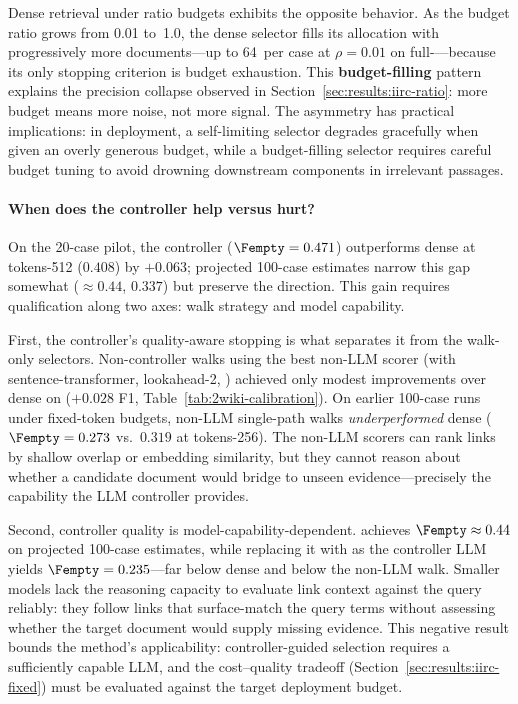 Dense retrieval under ratio budgets exhibits the opposite behavior.
As the budget ratio grows from 0.01 to~1.0, the dense selector fills its
allocation with progressively more documents---up to 64~per case at
$\rho = 0.01$ on full-\IIRC---because its only stopping criterion is
budget exhaustion.
This \textbf{budget-filling} pattern explains the precision collapse
observed in Section~\ref{sec:results:iirc-ratio}: more budget means more noise,
not more signal.
The asymmetry has practical implications: in deployment, a self-limiting
selector degrades gracefully when given an overly generous budget, while
a budget-filling selector requires careful budget tuning to avoid
drowning downstream components in irrelevant passages.

\paragraph{When does the controller help versus hurt?}
On the 20-case \IIRC pilot, the controller ($\Fempty =
0.471$) outperforms dense at tokens-512 ($0.408$) by $+0.063$;
projected 100-case estimates narrow this gap somewhat
(\selcontroller $\approx 0.44$, \seldense $0.337$) but preserve
the direction.
This gain requires qualification along two axes: walk strategy and
model capability.

First, the controller's quality-aware stopping is what separates it
from the walk-only selectors.
Non-controller walks using the best non-LLM scorer
(\selwalk with sentence-transformer, lookahead-2,
\stfuture) achieved only modest improvements over dense
on \TwoWikiShort ($+0.028$ F1, Table~\ref{tab:2wiki-calibration}).
On earlier 100-case \IIRC runs under fixed-token budgets, non-LLM
single-path walks \emph{underperformed} dense
($\Fempty = 0.273$ vs.\ $0.319$ at tokens-256).
The non-LLM scorers can rank links by shallow overlap or embedding
similarity, but they cannot reason about whether a candidate document
would bridge to unseen evidence---precisely the capability the LLM
controller provides.

Second, controller quality is model-capability-dependent.
\controllerlm achieves $\Fempty \approx 0.44$ on projected 100-case
estimates, while replacing it with \controllersmall as the controller
LLM yields $\Fempty = 0.235$---far below dense and
below the non-LLM walk.
Smaller models lack the reasoning capacity to evaluate link context
against the query reliably: they follow links that surface-match the
query terms without assessing whether the target document would supply
missing evidence.
This negative result bounds the method's applicability:
controller-guided selection requires a sufficiently capable LLM,
and the cost--quality tradeoff (Section~\ref{sec:results:iirc-fixed}) must be
evaluated against the target deployment budget.

